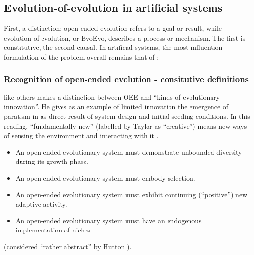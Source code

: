 \subsection{Evolution-of-evolution in artificial systems}

First, a distinction: open-ended evolution refers to a goal or result, while evolution-of-evolution, or EvoEvo, describes a process or mechanism. The first is constitutive, the second causal. In artificial systems, the most influention formulation of the problem overall remains that of \cite{Bedau:2000mi}:


\subsubsection{Recognition of open-ended evolution - consitutive definitions}

\autocite{Taylor2001} like others makes a distinction between OEE and ``kinds of evolutionary innovation''. He gives as an example of limited innovation the emergence of paratism in \cite{Ray1991} as direct result of system design and initial seeding conditions. In this reading, ``fundamentally new'' (labelled by Taylor as ``creative'') means new ways of sensing the environment and interacting with it \cite{Taylor2001}.


\begin{itemize}
	\item An open-ended evolutionary system must demonstrate unbounded diversity during its growth phase.
	\item An open-ended evolutionary system must embody selection.
	\item An open-ended evolutionary system must exhibit continuing (``positive'') new adaptive activity.
	\item An open-ended evolutionary system must have an endogenous implementation of niches.
\end{itemize} \cite{Maley1999} (considered ``rather abstract'' by Hutton \parencite[p.341]{Hutton2002}).

